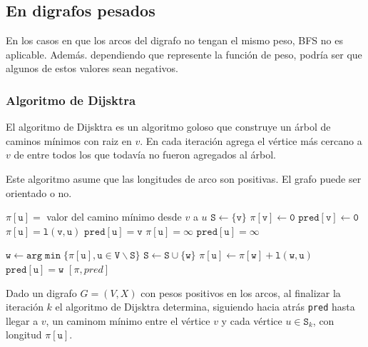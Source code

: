 \subsection{En digrafos pesados}
En los casos en que los arcos del digrafo no tengan el mismo peso, BFS no es aplicable. Además. dependiendo que represente la función de peso, podría ser que algunos de estos valores sean negativos.

\subsubsection{Algoritmo de Dijsktra}
El algoritmo de Dijsktra es un algoritmo goloso que construye un árbol de caminos mínimos con raiz en \(v\). En cada iteración agrega el vértice más cercano a \(v\) de entre todos los que todavía no fueron agregados al árbol.

Este algoritmo asume que las longitudes de arco son positivas. El grafo puede ser orientado o no.

\begin{algorithmic}
  \State $\mathtt{\pi[u] =}$ valor del camino mínimo desde $v$ a $u$
  \State $\mathtt{S \gets \{v\}}$
  \State $\mathtt{\pi[v] \gets 0}$
  \State $\mathtt{pred[v] \gets 0}$
  \State $\mathtt{\pi[u] = l(v, u)}$
  \State $\mathtt{pred[u] = v}$
  \Else
  \State $\mathtt{\pi[u] = \infty}$
  \State $\mathtt{pred[u] = \infty}$
  \EndIf
  \EndFor

  \State $\mathtt{w\gets arg\min\{\pi[u], u\in V\backslash S\}}$
  \State $\mathtt{S \gets S\cup\{w\}}$
  \State $\mathtt{\pi[u] \gets \pi[w] + l(w,u)}$
  \State $\mathtt{pred[u] = w}$
  \EndIf
  \EndFor
  \EndWhile
  \State\Return$[\mathtt{\pi}, pred]$
  \EndProcedure
\end{algorithmic}

\begin{lema}
  Dado un digrafo \(G=(V,X)\) con pesos positivos en los arcos, al finalizar la iteración \(k\) el algoritmo de Dijsktra determina, siguiendo hacia atrás \texttt{pred} hasta llegar a \(v\), un caminom mínimo entre el vértice \(v\) y cada vértice \(u \in \texttt{S}_k\), con longitud $\mathtt{\pi[u]}$.
\end{lema}

